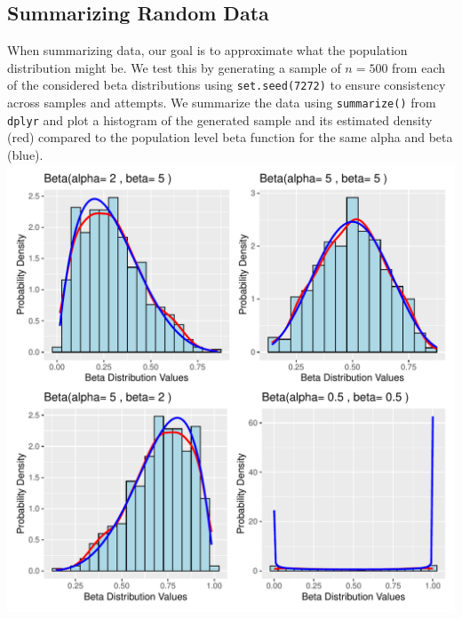 \documentclass{article}\usepackage[]{graphicx}\usepackage[]{xcolor}
\makeatletter
\def\maxwidth{ %
  \ifdim\Gin@nat@width>\linewidth
    \linewidth
  \else
    \Gin@nat@width
  \fi
}
\newenvironment{knitrout}{}{} %
\makeatother
\begin{document}
\begin{multicols}{2}
\begin{table}[H]
\centering
{} %
\caption{Summary of Beta Distribution Parameters}
\end{table}

\subsection{Summarizing Random Data}
When summarizing data, our goal is to approximate what the population distribution might be. We test this by generating a sample of $n = 500$ from each of the considered beta distributions using \texttt{set.seed(7272)} to ensure consistency across samples and attempts. We summarize the data using \texttt{summarize()} from \texttt{dplyr} \citep{tidyverse} and plot a histogram of the generated sample and its estimated density (red) compared to the population level beta function for the same alpha and beta (blue).
\begin{knitrout}\scriptsize
{}\color{fgcolor}
\includegraphics[width=\maxwidth]{figure/unnamed-chunk-2-1} 
\end{knitrout}


\end{multicols}
\end{document}
